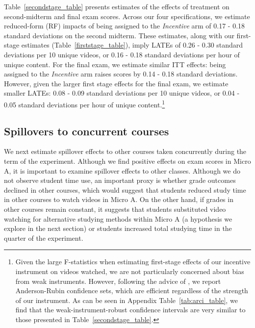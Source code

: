 \documentclass[12pt]{article}
\begin{document}
Table~\ref{secondstage_table} presents estimates of the effects of treatment on second-midterm and final exam scores.
Across our four specifications, we estimate reduced-form (RF) impacts of being assigned to the \textit{Incentive} arm of 0.17 - 0.18 standard deviations on the second midterm.
These estimates, along with our first-stage estimates (Table~\ref{firststage_table}), imply LATEs of 0.26 - 0.30 standard deviations per 10 unique videos, or 0.16 - 0.18 standard deviations per hour of unique content.
For the final exam, we estimate similar ITT effects: being assigned to the \textit{Incentive} arm raises scores by 0.14 - 0.18 standard deviations.
However, given the larger first stage effects for the final exam, we estimate smaller LATEs: 0.08 - 0.09 standard deviations per 10 unique videos, or 0.04 - 0.05 standard deviations per hour of unique content.\footnote{Given the large F-statistics when estimating first-stage effects of our incentive instrument on videos watched, we are not particularly concerned about bias from weak instruments. However, following the advice of \textcite{ass2019}, we report Anderson-Rubin confidence sets, which are efficient regardless of the strength of our instrument. As can be seen in Appendix Table~\ref{tab:arci_table}, we find that the weak-instrument-robust confidence intervals are very similar to those presented in Table~\ref{secondstage_table}.}

\subsection{Spillovers to concurrent courses}\label{subsec:spillovers}

We next estimate spillover effects to other courses taken concurrently during the term of the experiment.
Although we find positive effects on exam scores in Micro A, it is important to examine spillover effects to other classes.
Although we do not observe student time use, an important proxy is whether grade outcomes declined in other courses, which would suggest that students reduced study time in other courses to watch videos in Micro A. On the other hand, if grades in other courses remain constant, it suggests that students substituted video watching for alternative studying methods within Micro A (a hypothesis we explore in the next section) or students increased total studying time in the quarter of the experiment.
\end{document}

